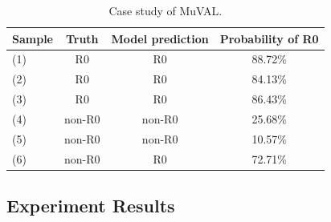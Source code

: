 \begin{table}
 \centering
 \caption{Case study of MuVAL.}
 \label{tab:case}
 \tabcolsep=3pt
 \begin{tabular}{lccc}
  \toprule
  Sample & Truth & Model prediction & Probability of R0\\
  \midrule
    (1) & R0 & R0 & 88.72\%\\ %
    (2) & R0 & R0 & 84.13\%\\ %
    (3) & R0 & R0 & 86.43\%\\ %
  \midrule
    (4) & non-R0 & non-R0 & 25.68\%\\ %
    (5) & non-R0 & non-R0 & 10.57\%\\ %
    (6) & non-R0 & R0 & 72.71\%\\ %
  \bottomrule
 \end{tabular}
\end{table}

\subsection{Experiment Results} 


